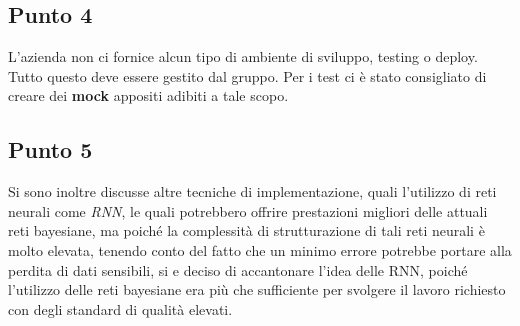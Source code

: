\subsection{Punto 4}
L'azienda non ci fornice alcun tipo di ambiente di sviluppo, testing o deploy. Tutto questo deve essere 
gestito dal gruppo. Per i test ci è stato consigliato di creare dei \textbf{mock} appositi adibiti a tale scopo. 

\subsection{Punto 5}
Si sono inoltre discusse altre tecniche di implementazione, quali l'utilizzo di reti neurali come \textit{RNN}, 
le quali potrebbero offrire prestazioni migliori delle attuali reti bayesiane, ma poiché la complessità di 
strutturazione di tali reti neurali è molto elevata, tenendo conto del fatto che un minimo errore potrebbe 
portare alla perdita di dati sensibili, si e deciso di accantonare l'idea delle RNN, poiché l'utilizzo delle reti 
bayesiane era più che sufficiente per svolgere il lavoro richiesto con degli standard di qualità elevati. 

